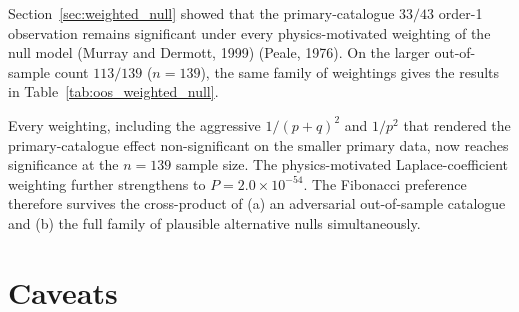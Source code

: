\documentclass[twocolumn,11pt]{article}
\begin{document}
Section~\ref{sec:weighted_null} showed that the primary-catalogue
$33/43$ order-1 observation remains significant under every
physics-motivated weighting of the null model
(Murray and Dermott, 1999) (Peale, 1976).
On the larger out-of-sample count $113/139$ ($n=139$), the same
family of weightings gives the results in
Table~\ref{tab:oos_weighted_null}.

\begin{table}[h]
\centering
\small
\caption{Binomial $P(X \geq 113 \mid n=139)$ on the out-of-sample
order-1 data under the null weightings of
Table~\ref{tab:weighted_null}.}
\label{tab:oos_weighted_null}
\end{table}

Every weighting, including the aggressive $1/(p+q)^2$ and $1/p^2$
that rendered the primary-catalogue effect non-significant on the
smaller primary data, now reaches significance at the $n=139$
sample size. The physics-motivated Laplace-coefficient weighting
\citep{murray1999} further strengthens to $P = 2.0 \times 10^{-54}$.
The Fibonacci preference therefore survives the cross-product of
(a) an adversarial out-of-sample catalogue and (b) the full family
of plausible alternative nulls simultaneously.

\section{Caveats}
\label{sec:caveats}
\end{document}

